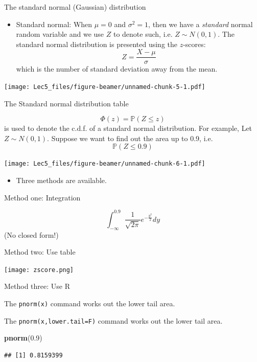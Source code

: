 \documentclass[ignorenonframetext,]{beamer}
\newenvironment{Shaded}{\begin{snugshade}}{\end{snugshade}}
\newcommand{\KeywordTok}[1]{\textcolor[rgb]{0.13,0.29,0.53}{\textbf{#1}}}
\newcommand{\FloatTok}[1]{\textcolor[rgb]{0.00,0.00,0.81}{#1}}
\newcommand{\NormalTok}[1]{#1}
\providecommand{\tightlist}{%
  \setlength{\itemsep}{0pt}\setlength{\parskip}{0pt}}
\begin{document}
\begin{frame}{The standard normal (Gaussian) distribution}

\begin{itemize}
\tightlist
\item
  Standard normal: When \(\mu=0\) and \(\sigma^2=1\), then we have a
  \emph{standard} normal random variable and we use \(Z\) to denote
  such, i.e. \(Z\sim N(0,1)\). The standard normal distribution is
  presented using the \(z\)-scores: \[Z=\frac{X-\mu}{\sigma}\] which is
  the number of standard deviation away from the mean.
\end{itemize}

\texttt{[image: Lec5\_files/figure-beamer/unnamed-chunk-5-1.pdf]}

\end{frame}

\begin{frame}{The Standard normal distribution table}

\[\Phi(z)=\mathbb{P}(Z\le z)\] is used to denote the c.d.f. of a
standard normal distribution. For example, Let \(Z\sim N(0,1)\). Suppose
we want to find out the area up to 0.9, i.e. \[\mathbb{P}(Z\le 0.9)\]

\texttt{[image: Lec5\_files/figure-beamer/unnamed-chunk-6-1.pdf]}

\begin{itemize}
\tightlist
\item
  Three methods are available.
\end{itemize}

\end{frame}

\begin{frame}{Method one: Integration}

\[\int^{0.9}_{-\infty}\frac{1}{\sqrt{2\pi}}e^{-\frac{y^2}{2}}dy\] (No
closed form!)

\end{frame}

\begin{frame}{Method two: Use table}

\texttt{[image: zscore.png]}

\end{frame}

\begin{frame}[fragile]{Method three: Use R}

The \texttt{pnorm(x)} command works out the lower tail area.

The \texttt{pnorm(x,lower.tail=F)} command works out the lower tail
area.

\begin{Shaded}
\begin{Highlighting}[]
\KeywordTok{pnorm}\NormalTok{(}\FloatTok{0.9}\NormalTok{)}
\end{Highlighting}
\end{Shaded}

\begin{verbatim}
## [1] 0.8159399
\end{verbatim}

\end{frame}
\end{document}
